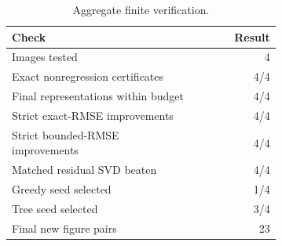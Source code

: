 \begin{table}[H]
\centering
\caption{Aggregate finite verification.}
\label{tab:am2-verify}
\small
\begin{tabular}{L{0.68\linewidth}r}
\toprule
Check & Result\\
\midrule
Images tested & 4\\
Exact nonregression certificates & 4/4\\
Final representations within budget & 4/4\\
Strict exact-RMSE improvements & 4/4\\
Strict bounded-RMSE improvements & 4/4\\
Matched residual SVD beaten & 4/4\\
Greedy seed selected & 1/4\\
Tree seed selected & 3/4\\
Final new figure pairs & 23\\
\bottomrule
\end{tabular}
\end{table}

